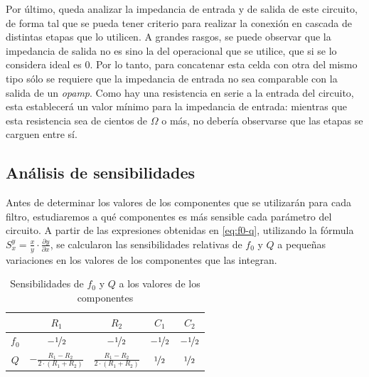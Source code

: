 \documentclass[../../tc_tp5_main.tex]{subfiles}
\begin{document}
Por \'ultimo, queda analizar la impedancia de entrada y de salida de este circuito, de forma tal que se pueda tener criterio para realizar la conexi\'on en cascada de distintas etapas que lo utilicen. A grandes rasgos, se puede observar que la impedancia de salida no es sino la del operacional que se utilice, que si se lo considera ideal es 0. Por lo tanto, para concatenar esta celda con otra del mismo tipo s\'olo se requiere que la impedancia de entrada no sea comparable con la salida de un \textit{opamp}. Como hay una resistencia en serie a la entrada del circuito, esta establecer\'a un valor m\'inimo para la impedancia de entrada: mientras que esta resistencia sea de cientos de $\Omega$ o m\'as, no deber\'ia observarse que las etapas se carguen entre s\'i.\par 



\subsection{An\'alisis de sensibilidades} 

Antes de determinar los valores de los componentes que se utilizar\'an para cada filtro, estudiaremos a qu\'e componentes es m\'as sensible cada par\'ametro del circuito. A partir de las expresiones obtenidas en \ref{eq:f0-q}, utilizando la f\'ormula $S_x^y = \frac{x}{y} \cdot \frac{\partial y}{\partial x}$, se calcularon las sensibilidades relativas de $f_0$ y $Q$ a peque\~nas variaciones en los valores de los componentes que las integran.

\begin{table}[H]
	\centering
	\begin{tabular}{|c||c|c|c|c|}
	\hline
      	& $R_1$                                       & $R_2$                                     & $C_1$              & $C_2$              \\ \hline \hline
	$f_0$ & $-\nicefrac{1}{2}$                          & $-\nicefrac{1}{2}$                        & $-\nicefrac{1}{2}$ & $-\nicefrac{1}{2}$ \\ \hline
	$Q$   & $ - \frac{R_1 - R_2}{2 \cdot (R_1 + R_2)} $ & $ \frac{R_1 - R_2}{2 \cdot (R_1 + R_2)} $ & $\nicefrac{1}{2}$ & $\nicefrac{1}{2}$  \\ \hline
	\end{tabular}
	
	\caption{Sensibilidades de $f_0$ y $Q$ a los valores de los componentes}
\end{table}
\end{document}
